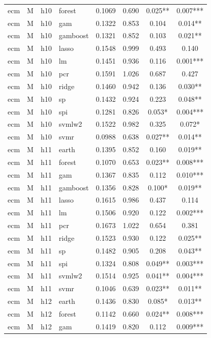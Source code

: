 \begin{ThreePartTable}
\begin{longtable}[t]{llclcccc}
ecm & M & h10 & forest & 0.1069 & 0.690 & 0.025** & 0.007***\\
ecm & M & h10 & gam & 0.1322 & 0.853 & 0.104 & 0.014**\\
ecm & M & h10 & gamboost & 0.1321 & 0.852 & 0.103 & 0.021**\\
ecm & M & h10 & lasso & 0.1548 & 0.999 & 0.493 & 0.140\\
ecm & M & h10 & lm & 0.1451 & 0.936 & 0.116 & 0.001***\\
ecm & M & h10 & pcr & 0.1591 & 1.026 & 0.687 & 0.427\\
ecm & M & h10 & ridge & 0.1460 & 0.942 & 0.136 & 0.030**\\
ecm & M & h10 & sp & 0.1432 & 0.924 & 0.223 & 0.048**\\
ecm & M & h10 & spi & 0.1281 & 0.826 & 0.053* & 0.004***\\
ecm & M & h10 & svmlw2 & 0.1522 & 0.982 & 0.325 & 0.072*\\
ecm & M & h10 & svmr & 0.0988 & 0.638 & 0.027** & 0.014**\\
\addlinespace
ecm & M & h11 & earth & 0.1395 & 0.852 & 0.160 & 0.019**\\
ecm & M & h11 & forest & 0.1070 & 0.653 & 0.023** & 0.008***\\
ecm & M & h11 & gam & 0.1367 & 0.835 & 0.112 & 0.010***\\
ecm & M & h11 & gamboost & 0.1356 & 0.828 & 0.100* & 0.019**\\
ecm & M & h11 & lasso & 0.1615 & 0.986 & 0.437 & 0.114\\
ecm & M & h11 & lm & 0.1506 & 0.920 & 0.122 & 0.002***\\
ecm & M & h11 & pcr & 0.1673 & 1.022 & 0.654 & 0.381\\
ecm & M & h11 & ridge & 0.1523 & 0.930 & 0.122 & 0.025**\\
ecm & M & h11 & sp & 0.1482 & 0.905 & 0.208 & 0.043**\\
ecm & M & h11 & spi & 0.1324 & 0.808 & 0.049** & 0.003***\\
ecm & M & h11 & svmlw2 & 0.1514 & 0.925 & 0.041** & 0.004***\\
ecm & M & h11 & svmr & 0.1046 & 0.639 & 0.023** & 0.011**\\
\addlinespace
ecm & M & h12 & earth & 0.1436 & 0.830 & 0.085* & 0.013**\\
ecm & M & h12 & forest & 0.1142 & 0.660 & 0.024** & 0.008***\\
ecm & M & h12 & gam & 0.1419 & 0.820 & 0.112 & 0.009***\\

\end{longtable}
\end{ThreePartTable}
